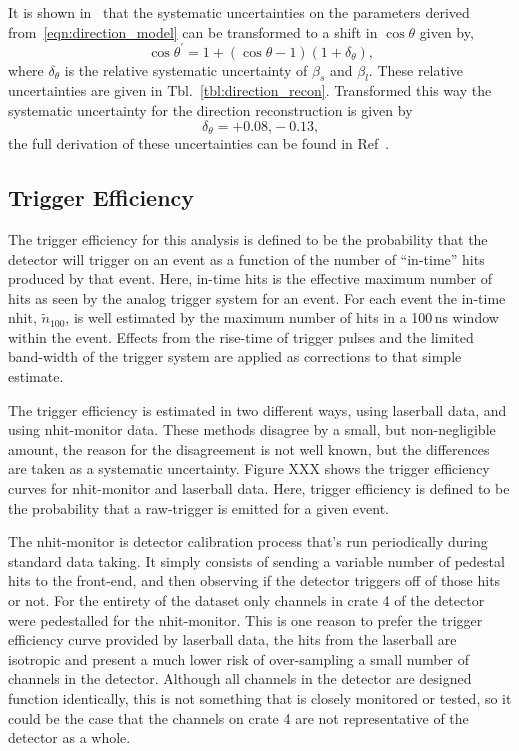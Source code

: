 It is shown in~\citep{pierre_luc_thesis} that the systematic uncertainties on the
parameters derived from~\eqref{eqn:direction_model} can be transformed to a shift
in $\cos\theta$ given by,
\begin{equation}
    \cos\theta^{\prime} = 1+(\cos\theta-1)(1+\delta_{\theta})\text{,}
\end{equation}
where $\delta_{\theta}$ is the relative systematic uncertainty of $\beta_{s}$ and $\beta_{l}$.
These relative uncertainties are given in Tbl.~\ref{tbl:direction_recon}.
Transformed this way the systematic uncertainty for the direction reconstruction
is given by
\begin{equation*}
    \delta_{\theta} = +0.08\text{,} -0.13\text{,}
\end{equation*}
the full derivation of these uncertainties can be found in Ref~\citep{snop_water_unidoc}.

\subsection{Trigger Efficiency}
\label{sec:trigeff}
The trigger efficiency for this analysis is defined to be the probability that
the detector will trigger on an event as a function of the number of ``in-time''
hits produced by that event.
Here, in-time hits is the effective maximum number of hits as seen by the analog
trigger system for an event.
For each event the in-time nhit, $\tilde{n}_{100}$, is well
estimated by the maximum number of hits in a 100\,ns window within the event.
Effects from the rise-time of trigger pulses and the limited band-width of the
trigger system are applied as corrections to that simple estimate.

The trigger efficiency is estimated in two different ways, using laserball
data, and using nhit-monitor data.
These methods disagree by a small, but non-negligible amount, the
reason for the disagreement is not well known, but the differences are taken
as a systematic uncertainty. Figure XXX shows the trigger efficiency curves
for nhit-monitor and laserball data.
Here, trigger efficiency is defined to be the probability that a raw-trigger
is emitted for a given event.

The nhit-monitor is detector calibration  process that's run periodically during
standard data taking. It simply consists of sending a variable number
of pedestal hits to the front-end, and then observing if the detector triggers
off of those hits or not. For the entirety of the dataset only channels in
crate 4 of the detector were pedestalled for the nhit-monitor.
This is one reason to prefer the trigger efficiency curve provided by laserball
data, the hits from the laserball are isotropic and present a much lower risk of
over-sampling a small number of channels in the detector. Although all channels
in the detector are designed function identically, this is not something that
is closely monitored or tested, so it could be the case that the channels on
crate 4 are not representative of the detector as a whole.

